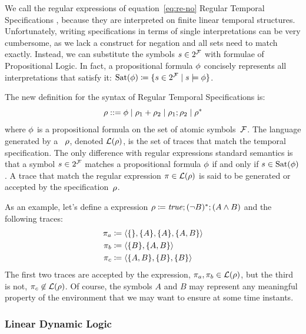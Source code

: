 We call the regular expressions of equation~\eqref{eq:re-no} Regular Temporal
Specifications \re{}, because they are interpreted on finite linear temporal
structures. Unfortunately, writing specifications in terms of single
interpretations can be very cumbersome, as we lack a construct for negation
and all sets need to match exactly. Instead, we can substitute the symbols $s
\in 2^{\mathcal{F}}$ with formulae of Propositional Logic. In fact, a propositional
formula $\phi$ concisely represents all interpretations that satisfy
it: $\text{Sat}(\phi) \coloneqq \{s \in 2^{\mathcal{F}} \mid s \models
\phi\}$.

The new definition for the syntax of Regular Temporal Specifications \re{} is:
\begin{equation}
	\rho ::= \phi \mid
	\rho_1 + \rho_2 \mid \rho_1 ; \rho_2 \mid \rho^*
	\label{eq:re}
\end{equation}
where $\phi$ is a propositional formula on the set of atomic
symbols~$\mathcal{F}$. The language generated by a \re{}~$\rho$, denoted
$\mathcal{L}(\rho)$, is the set of traces that match the temporal
specification. The only difference with regular expressions standard
semantics is that a symbol $s \in 2^{\mathcal{F}}$ matches a propositional formula
$\phi$ if and only if $s \in \text{Sat}(\phi)$. A trace that
match the regular expression $\pi \in \mathcal{L}(\rho)$ is said to be
generated or accepted by the specification~$\rho$.

\begin{example}
	As an example, let's define a \re{} expression $\rho \coloneqq \text{\textit{true}};
	(\neg B)^*; (A \land B)$ and the following traces:
	\begin{align*}
		\pi_a &\coloneqq \langle \{\}, \{A\}, \{A\}, \{A,B\} \rangle \\
		\pi_b &\coloneqq \langle \{B\}, \{A,B\} \rangle \\
		\pi_c &\coloneqq \langle \{A, B\}, \{B\}, \{B\} \rangle \\
	\end{align*}
	The first two traces are accepted by the expression, $\pi_a, \pi_b \in
	\mathcal{L}(\rho)$, but the third is not, $\pi_c \not\in
	\mathcal{L}(\rho)$. Of course, the symbols $A$ and $B$ may represent any
	meaningful property of the environment that we may want to ensure
	at some time instants.
\end{example}


\subsubsection{Linear Dynamic Logic}

